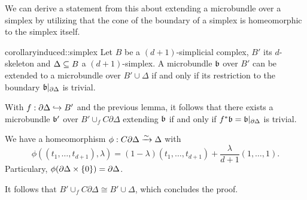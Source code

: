 \begin{myparagraph}
    We can derive a statement from this about extending a microbundle over a simplex
    by utilizing that the cone of the boundary of a simplex 
    is homeomorphic to the simplex itself.
\end{myparagraph}

\begin{mystatement}{corollary}{induced::simplex}
    Let $B$ be a $(d + 1)$-simplicial complex, $B'$ its $d$-skeleton and $\Delta \subseteq{} B$ a $(d + 1)$-simplex.
    A microbundle $\bb$ over $B'$ can be extended to a microbundle over $B' \cup \Delta$
    if and only if its restriction to the boundary $\bb[\partial \Delta]$ is trivial.
\end{mystatement}

\begin{myproof}
    With $f: \partial \Delta \hookrightarrow{} B'$ and the previous lemma,
    it follows that there exists a microbundle $\bb'$ over $B' \cup_f C\partial\Delta$ extending $\bb$
    if and only if $\ind{f}\bb = \bb[\partial\Delta]$ is trivial.

    We have a homeomorphism $\phi: C\partial \Delta \xrightarrow{\sim} \Delta$ with
    \[ \phi((t_1, \dots, t_{d + 1}), \lambda) = (1 - \lambda) (t_1, \dots, t_{d + 1}) + \frac{\lambda}{d + 1} (1, \dots, 1). \]
    Particulary, $\phi(\partial \Delta \times \{0\}) = \partial \Delta$.

    It follows that $B' \cup_f C \partial\Delta \cong B' \cup \Delta$, which concludes the proof.
\end{myproof}